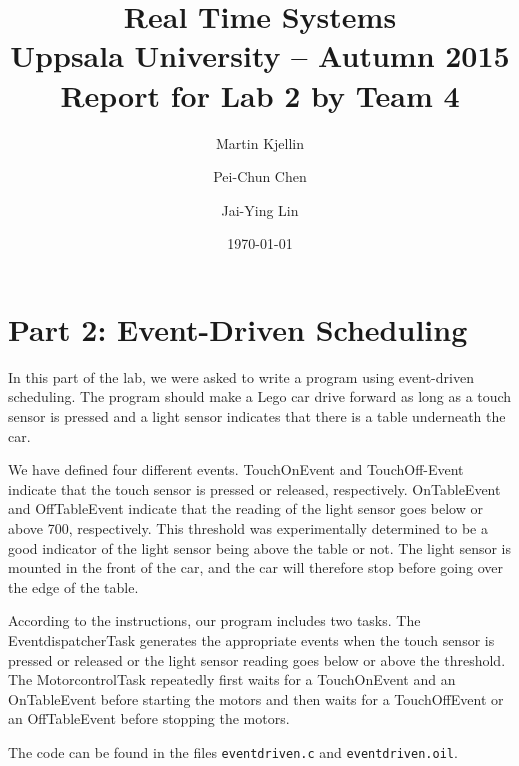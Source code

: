 \documentclass[a4paper,11pt]{article}
\title{\textbf{Real Time Systems\\
    Uppsala University -- Autumn 2015\\
    Report for Lab 2 by Team 4
  }
}
\author{Martin Kjellin \and Pei-Chun Chen \and Jai-Ying Lin}
\date{\today}
\begin{document}
\maketitle

\section*{Part 2: Event-Driven Scheduling}

In this part of the lab, we were asked to write a program using event-driven scheduling. The program should make a Lego car drive forward as long as a touch sensor is pressed and a light sensor indicates that there is a table underneath the car.

We have defined four different events. TouchOnEvent and TouchOff-Event indicate that the touch sensor is pressed or released, respectively. OnTableEvent and OffTableEvent indicate that the reading of the light sensor goes below or above 700, respectively. This threshold was experimentally determined to be a good indicator of the light sensor being above the table or not. The light sensor is mounted in the front of the car, and the car will therefore stop before going over the edge of the table.

According to the instructions, our program includes two tasks. The EventdispatcherTask generates the appropriate events when the touch sensor is pressed or released or the light sensor reading goes below or above the threshold. The MotorcontrolTask repeatedly first waits for a TouchOnEvent and an OnTableEvent before starting the motors and then waits for a TouchOffEvent or an OffTableEvent before stopping the motors.

The code can be found in the files \texttt{eventdriven.c} and \texttt{eventdriven.oil}.
\end{document}
